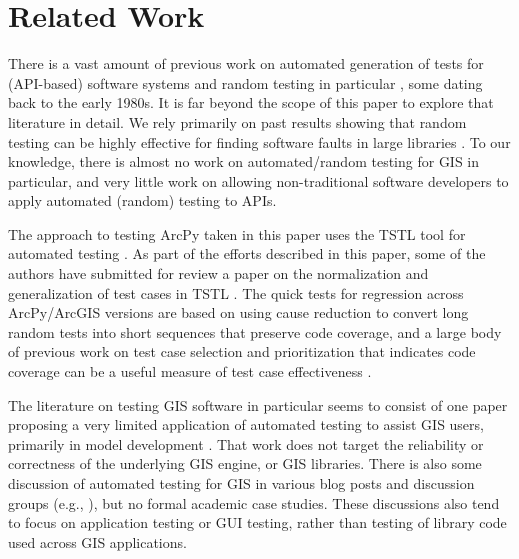 \section{Related Work}

There is a vast amount of previous work on automated generation of
tests for (API-based) software systems
\cite{Pacheco,FA11,GodefroidKS05} and random testing in particular
\cite{ICSEDiff,Pacheco,AMFL11,ARTChen,ISSTAART,FASE,HamletOnly,Hamlet94,ClaessenH00,CiupaLOM07,RandFormal,WODA08,andrews-etal-rute-rt,ASE08,evalrand,csmith},
some dating back to the early 1980s. It is far beyond the scope of
this paper to explore that literature in detail.  We rely primarily on past
results showing that random testing can be highly effective for
finding software faults in large libraries
\cite{Pacheco,ICSEDiff,RandFormal,CFV08,AMAI}.  To our knowledge, there is almost
no work on automated/random testing for GIS in particular, and very
little work on allowing non-traditional software developers to apply
automated (random) testing to APIs.

The approach to testing ArcPy taken in this paper uses the TSTL tool
for automated testing \cite{NFM15,ISSTA15,tstl}.  As part of the
efforts described in this paper, some of the authors have submitted for review a
paper on the normalization and generalization of test cases in TSTL
\cite{ICSTnorm}.  The quick tests for regression across ArcPy/ArcGIS
versions are based on using cause reduction
\cite{icst2014,stvrcausereduce} to convert long random tests into
short sequences that preserve code coverage, and a large body of
previous work on test case selection and prioritization that indicates
code coverage \cite{ISSTA13,ICSE14Cov} can be a useful measure of test
case effectiveness
\cite{SelectTest,YooHarman,Graves:2001:ESR:367008.367020}.

The literature on testing GIS software in particular seems to consist
of one paper proposing a very limited application of automated testing
to assist GIS users, primarily in model development \cite{GISTest}.
That work does not target the reliability or correctness of the
underlying GIS engine, or GIS libraries.  There is also some
discussion of automated testing for GIS in various blog posts and
discussion groups (e.g., \cite{gisblog1,gisblog2}), but no formal
academic case studies.  These discussions also tend to focus on
application testing or GUI testing, rather than testing of library
code used across GIS applications.

